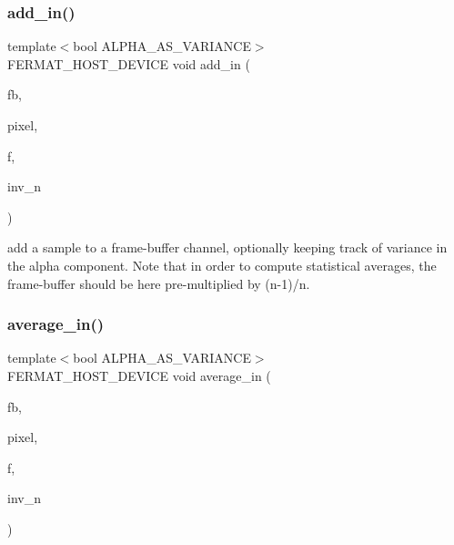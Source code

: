 \subsubsection{\texorpdfstring{add\+\_\+in()}{add\_in()}}
{\footnotesize\ttfamily template$<$bool A\+L\+P\+H\+A\+\_\+\+A\+S\+\_\+\+V\+A\+R\+I\+A\+N\+CE$>$ \\
F\+E\+R\+M\+A\+T\+\_\+\+H\+O\+S\+T\+\_\+\+D\+E\+V\+I\+CE void add\+\_\+in (\begin{DoxyParamCaption}\item[{\hyperlink{struct_f_buffer_channel_view}{F\+Buffer\+Channel\+View} \&}]{fb,  }\item[{const uint32\+\_\+t}]{pixel,  }\item[{const \hyperlink{structcugar_1_1_vector}{cugar\+::\+Vector3f}}]{f,  }\item[{const float}]{inv\+\_\+n }\end{DoxyParamCaption})}

add a sample to a frame-\/buffer channel, optionally keeping track of variance in the alpha component. Note that in order to compute statistical averages, the frame-\/buffer should be here pre-\/multiplied by (n-\/1)/n. \mbox{\label{group___framebuffer_module_ga5dc81569ddc64436e1fe3638e3e031ce}} 
\subsubsection{\texorpdfstring{average\+\_\+in()}{average\_in()}\hspace{0.1cm}{\footnotesize\ttfamily [1/2]}}
{\footnotesize\ttfamily template$<$bool A\+L\+P\+H\+A\+\_\+\+A\+S\+\_\+\+V\+A\+R\+I\+A\+N\+CE$>$ \\
F\+E\+R\+M\+A\+T\+\_\+\+H\+O\+S\+T\+\_\+\+D\+E\+V\+I\+CE void average\+\_\+in (\begin{DoxyParamCaption}\item[{\hyperlink{struct_f_buffer_channel_view}{F\+Buffer\+Channel\+View} \&}]{fb,  }\item[{const uint32\+\_\+t}]{pixel,  }\item[{const \hyperlink{structcugar_1_1_vector}{cugar\+::\+Vector4f}}]{f,  }\item[{const float}]{inv\+\_\+n }\end{DoxyParamCaption})}

